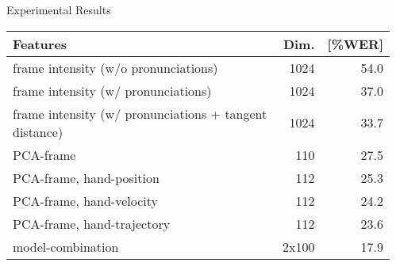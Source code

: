 \documentclass[final,t]{beamer}
\begin{document}
\begin{frame}{}
\begin{columns}[t]
\begin{column}{.3\linewidth}
    \end{column}

    
    \begin{column}{.3\linewidth}

      \begin{block}{Experimental Results}
        \centering
\fbox{\rule{0pt}{2in} \rule{0.33\linewidth}{0pt}}
\fbox{\rule{0pt}{2in} \rule{0.33\linewidth}{0pt}}
\fbox{\rule{0pt}{2in} \rule{0.33\linewidth}{0pt}}

        \begin{table}
          \centering
          \begin{tabular}{@{} p{.7\linewidth} r r @{}}
            \toprule
            Features                                                             & Dim.            & [\%WER] \\
            \midrule
            frame intensity (w/o pronunciations)                                 & 1024            & 54.0    \\%
            frame intensity (w/ pronunciations)                                  & 1024            & 37.0    \\
            frame intensity (w/ pronunciations + tangent distance)               & 1024            & 33.7    \\%
            PCA-frame                                                            & 110             & 27.5    \\
            PCA-frame, hand-position                                             & 112             & 25.3    \\
            PCA-frame, hand-velocity                                             & 112             & 24.2    \\
            PCA-frame, hand-trajectory                                           & 112             & 23.6    \\
            \addlinespace
            \addlinespace
            model-combination                                                    & 2x100           & 17.9    \\
            \bottomrule
          \end{tabular}
          \label{tab:baseline-results}
        \end{table}
      \end{block}
      

\end{column}
\end{columns}
\end{frame}
\end{document}
